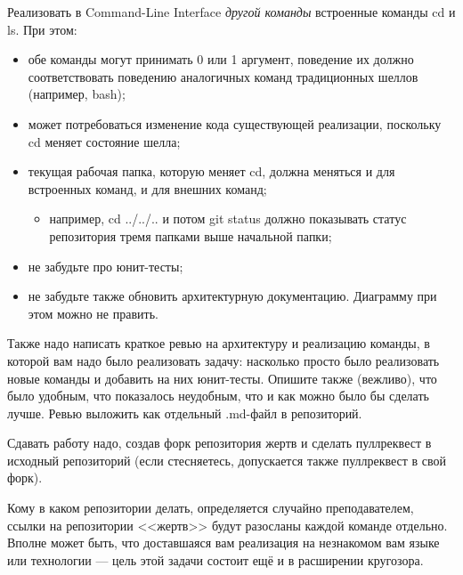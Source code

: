\documentclass[a5paper]{homework}
\begin{document}

Реализовать в Command-Line Interface \emph{другой команды} встроенные команды cd и ls. При этом:

\begin{itemize}
    \item обе команды могут принимать 0 или 1 аргумент, поведение их должно соответствовать поведению аналогичных команд традиционных шеллов (например, bash);
    \item может потребоваться изменение кода существующей реализации, поскольку cd меняет состояние шелла;
    \item текущая рабочая папка, которую меняет cd, должна меняться и для встроенных команд, и для внешних команд;
    \begin{itemize}
        \item например, cd ../../.. и потом git status должно показывать статус репозитория тремя папками выше начальной папки;
    \end{itemize}
    \item не забудьте про юнит-тесты;
    \item не забудьте также обновить архитектурную документацию. Диаграмму при этом можно не править.
\end{itemize}

Также надо написать краткое ревью на архитектуру и реализацию команды, в которой вам надо было реализовать задачу: насколько просто было реализовать новые команды и добавить на них юнит-тесты. Опишите также (вежливо), что было удобным, что показалось неудобным, что и как можно было бы сделать лучше. Ревью выложить как отдельный .md-файл в репозиторий.

Сдавать работу надо, создав форк репозитория жертв и сделать пуллреквест в исходный репозиторий (если стесняетесь, допускается также пуллреквест в свой форк).

Кому в каком репозитории делать, определяется случайно преподавателем, ссылки на репозитории <<жертв>> будут разосланы каждой команде отдельно. Вполне может быть, что доставшаяся вам реализация на незнакомом вам языке или технологии --- цель этой задачи состоит ещё и в расширении кругозора.
\end{document}
